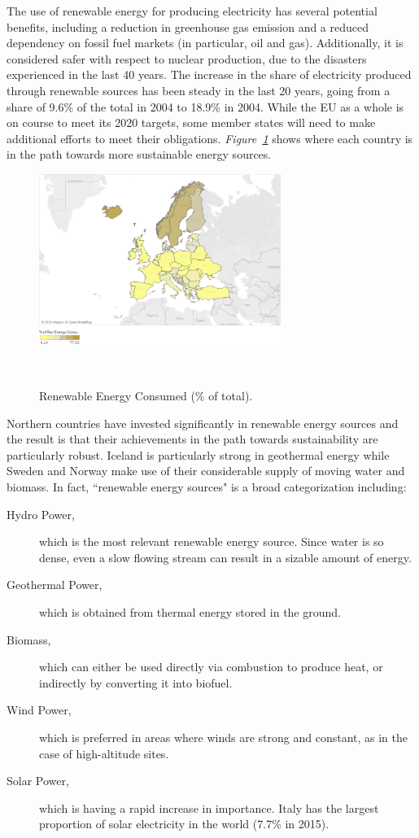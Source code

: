 \documentclass[a4paper,12pt]{book}
\begin{document}
The use of renewable energy for producing electricity has several potential benefits, including a reduction in greenhouse gas emission and a reduced dependency on fossil fuel markets (in particular, oil and gas). Additionally, it is considered safer with respect to nuclear production, due to the disasters experienced in the last 40 years. The increase in the share of electricity produced through renewable sources has been steady in the last 20 years, going from a share of 9.6\% of the total in 2004 to 18.9\% in 2004. While the EU as a whole is on course to meet its 2020 targets, some member states will need to make additional efforts to meet their obligations.
\textit{Figure~\ref{fig:ren}} shows where each country is in the path towards more sustainable energy sources.

\begin{figure}[tb]
\begin{center}
\captionsetup{justification=centering}
\includegraphics[width=0.7\textwidth]{Images/ren.png}
\caption{Renewable Energy Consumed (\% of total). }
~\label{fig:ren}
\end{center}
\end{figure}

Northern countries have invested significantly in renewable energy sources and the result is that their achievements in the path towards sustainability are particularly robust. Iceland is particularly strong in geothermal energy while Sweden and Norway make use of their considerable supply of moving water and biomass. In fact, ``renewable energy sources" is a broad categorization including:

\begin{description}
\item[Hydro Power,] which is the most relevant renewable energy source. Since water is so dense, even a slow flowing stream can result in a sizable amount of energy.
\item [Geothermal Power,] which is obtained from thermal energy stored in the ground.
\item [Biomass,] which can either be used directly via combustion to produce heat, or indirectly by converting it into biofuel.
\item [Wind Power,] which is preferred in areas where winds are strong and constant, as in the case of high-altitude sites.
\item [Solar Power,] which is having a rapid increase in importance. Italy has the largest proportion of solar electricity in the world (7.7\% in 2015).
\end{description}
\end{document}
